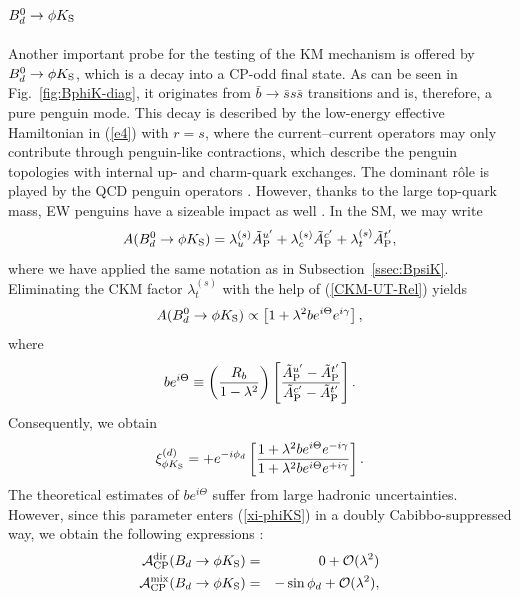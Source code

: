 \documentclass[12pt]{article}
\begin{document}
\subsection{$B^0_d\to \phi K_{\rm S}$}\label{ssec:BphiK}
\unboldmath
%
%
%
Another important probe for the testing of the KM mechanism is 
offered by $B_d^0\to \phi K_{\rm S}$, which is a 
decay into a CP-odd final state. As can be seen in Fig.~\ref{fig:BphiK-diag},
it originates from $\bar b\to \bar s s \bar s$ transitions and is, therefore, a 
pure penguin mode. This decay is described by the low-energy effective 
Hamiltonian in (\ref{e4}) with $r=s$, where the current--current operators 
may only contribute through penguin-like contractions, which describe the
penguin topologies with internal up- and charm-quark exchanges. The dominant
r\^ole is played by the QCD penguin operators \cite{BphiK-old}. However,
thanks to the large top-quark mass, EW penguins have a sizeable impact as 
well \cite{RF-EWP,DH-PhiK}. In the SM, we may write
\begin{equation}\label{B0phiK0-ampl}
A(B_d^0\to \phi K_{\rm S})=\lambda_u^{(s)}\tilde A_{\rm P}^{u'}
+\lambda_c^{(s)}\tilde A_{\rm P}^{c'}+\lambda_t^{(s)}\tilde A_{\rm P}^{t'},
\end{equation}
where we have applied the same notation as in Subsection~\ref{ssec:BpsiK}.
Eliminating the CKM factor $\lambda_t^{(s)}$ with the help of
(\ref{CKM-UT-Rel}) yields
\begin{equation}
A(B_d^0\to \phi K_{\rm S})\propto
\left[1+\lambda^2 b e^{i\Theta}e^{i\gamma}\right],
\end{equation}
where 
\begin{equation}
b e^{i\Theta}\equiv\left(\frac{R_b}{1-\lambda^2}\right)\left[
\frac{\tilde A_{\rm P}^{u'}-\tilde A_{\rm P}^{t'}}{\tilde A_{\rm P}^{c'}-
\tilde A_{\rm P}^{t'}}\right].
\end{equation}
Consequently,  we obtain
\begin{equation}\label{xi-phiKS}
\xi_{\phi K_{\rm S}}^{(d)}=+e^{-i\phi_d}
\left[\frac{1+\lambda^2b e^{i\Theta}e^{-i\gamma}}{1+
\lambda^2b e^{i\Theta}e^{+i\gamma}}\right].
\end{equation}
The theoretical estimates of $b e^{i\Theta}$ 
suffer from large hadronic uncertainties. However, since this parameter enters 
(\ref{xi-phiKS}) in a doubly Cabibbo-suppressed way, we obtain the 
following expressions \cite{RF-EWP-rev}:
\begin{eqnarray}
{\cal A}_{\rm CP}^{\rm dir}(B_d\to \phi K_{\rm S})&=&0+
{\cal O}(\lambda^2)\label{BphiK-rel1}\\
{\cal A}_{\rm CP}^{\rm mix}(B_d\to \phi K_{\rm S})&=&-\sin\phi_d
+{\cal O}(\lambda^2),\label{BphiK-rel2}
\end{eqnarray}
\end{document}
